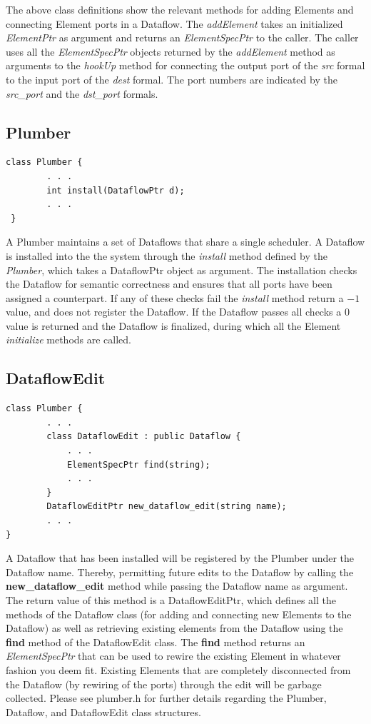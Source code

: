 \documentclass[12pt]{article}
\begin{document}
The above class definitions show the relevant methods for adding Elements and
connecting Element ports in a Dataflow. The \emph{addElement} takes an initialized
\emph{ElementPtr} as argument and returns an \emph{ElementSpecPtr} to the caller. 
The caller uses all the \emph{ElementSpecPtr} objects returned by the 
\emph{addElement} method as arguments to the \emph{hookUp} method for 
connecting the output port of the \emph{src} formal to the input port of the 
\emph{dest} formal. The port numbers are indicated by the \emph{src\_port} and
the \emph{dst\_port} formals.

\pagebreak
\subsection{Plumber}
\begin{verbatim}
class Plumber {
        . . .
        int install(DataflowPtr d);
        . . .
 }
\end{verbatim}
A Plumber maintains a set of Dataflows that share a single scheduler. 
A Dataflow is installed into the the system through the \emph{install} method
defined by the \emph{Plumber}, which takes a DataflowPtr object as argument.
The installation checks the Dataflow for semantic correctness and ensures that
all ports have been assigned a counterpart. If any of these checks fail the 
\emph{install} method return a $-1$ value, and does not register the Dataflow.
If the Dataflow passes all checks a $0$ value is returned and the Dataflow is
finalized, during which all the Element \emph{initialize} methods are called.

\subsection{DataflowEdit}
\begin{verbatim}
class Plumber {
        . . .
        class DataflowEdit : public Dataflow {
            . . .
            ElementSpecPtr find(string);
            . . .
        }
        DataflowEditPtr new_dataflow_edit(string name);
        . . .
}
\end{verbatim}
A Dataflow that has been installed will be registered by the Plumber under the
Dataflow name. Thereby, permitting future edits to the Dataflow by calling the
{\bf new\_dataflow\_edit} method while passing the Dataflow name as 
argument. The return value of this method is a DataflowEditPtr, which defines
all the methods of the Dataflow class (for adding and connecting new Elements
to the Dataflow) as well as retrieving existing elements from the Dataflow using
the {\bf find} method of the DataflowEdit class. The {\bf find} method
returns an \emph{ElementSpecPtr} that can be used to rewire the existing Element
in whatever fashion you deem fit. Existing Elements that are completely 
disconnected from the Dataflow (by rewiring of the ports) through the edit will be 
garbage collected. Please see plumber.h for further details regarding the Plumber,
Dataflow, and DataflowEdit class structures. 
\end{document}
